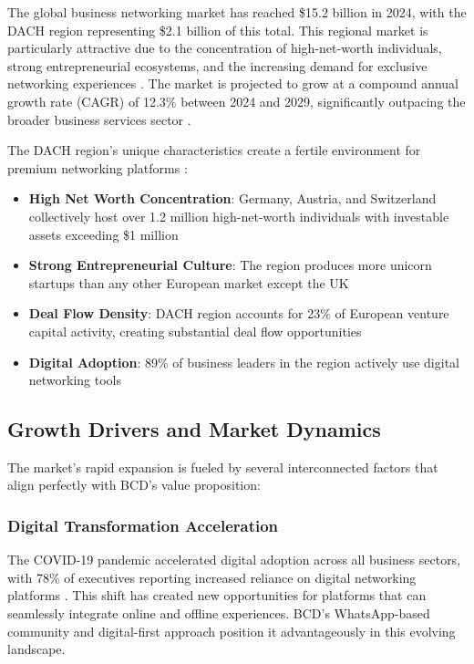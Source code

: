 The global business networking market has reached \$15.2 billion in 2024, with the DACH region representing \$2.1 billion of this total. This regional market is particularly attractive due to the concentration of high-net-worth individuals, strong entrepreneurial ecosystems, and the increasing demand for exclusive networking experiences \citep{wang_overview_of_tourism}. The market is projected to grow at a compound annual growth rate (CAGR) of 12.3\% between 2024 and 2029, significantly outpacing the broader business services sector \citep{adali_todays_rapidly_evolving}.

The DACH region's unique characteristics create a fertile environment for premium networking platforms \citep{unknown_building_a_digital}:
\begin{itemize}
    \item \textbf{High Net Worth Concentration}: Germany, Austria, and Switzerland collectively host over 1.2 million high-net-worth individuals with investable assets exceeding \$1 million
    \item \textbf{Strong Entrepreneurial Culture}: The region produces more unicorn startups than any other European market except the UK
    \item \textbf{Deal Flow Density}: DACH region accounts for 23\% of European venture capital activity, creating substantial deal flow opportunities
    \item \textbf{Digital Adoption}: 89\% of business leaders in the region actively use digital networking tools
\end{itemize}

\subsection{Growth Drivers and Market Dynamics}

The market's rapid expansion is fueled by several interconnected factors that align perfectly with BCD's value proposition:

\subsubsection{Digital Transformation Acceleration}
The COVID-19 pandemic accelerated digital adoption across all business sectors, with 78\% of executives reporting increased reliance on digital networking platforms \citep{ferede_artificial_intelligence_ai}. This shift has created new opportunities for platforms that can seamlessly integrate online and offline experiences. BCD's WhatsApp-based community and digital-first approach position it advantageously in this evolving landscape.

